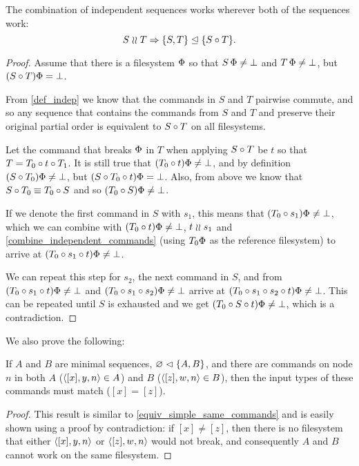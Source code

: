 \begin{mylem}\label{combine_independent_sequences}
The combination of independent sequences works wherever both of the sequences work:
\[ S\mathrel{\wr\wr} T \Rightarrow {\{S,T\}}\trianglelefteq{\{S\circ T\}}. \]
\end{mylem}
\begin{proof}
Assume that there is a filesystem $\Phi$ so that
$S\,\Phi\neq\bot$ and $T\,\Phi\neq\bot$, but
$(S\circ T)\Phi=\bot$.

From \cref{def_indep} we know that
the commands in $S$ and $T$ pairwise commute, and so any sequence
that contains the commands from $S$ and $T$ and preserve their original partial order
is equivalent to $S\circ T$ on all filesystems.

Let the command that breaks $\Phi$ in $T$ when applying $S\circ T$ be $t$
so that $T=T_0\circ t\circ T_1$.
It is still true that $(T_0 \circ t)\Phi\neq\bot$,
and by definition $(S\circ T_0)\Phi\neq\bot$,
but $(S\circ T_0\circ t)\Phi=\bot$.
Also, from above we know that $S\circ T_0\equiv T_0\circ S$
and so $(T_0 \circ S)\Phi\neq\bot$.

If we denote the first command in $S$ with $s_1$,
this means that $(T_0 \circ s_1)\Phi\neq\bot$,
which we can combine with $(T_0 \circ t)\Phi\neq\bot$, $t\mathrel{\wr\wr} s_1$ and
\cref{combine_independent_commands}
(using $T_0\Phi$ as the reference filesystem)
to arrive at $(T_0 \circ s_1\circ t)\Phi\neq\bot$.

We can repeat this step for $s_2$, the next command in $S$,
and from 
$(T_0 \circ s_1\circ t)\Phi\neq\bot$
and
$(T_0 \circ s_1\circ s_2)\Phi\neq\bot$
arrive at
$(T_0 \circ s_1\circ s_2\circ t)\Phi\neq\bot$.
This can be repeated until $S$ is exhausted and we get
$(T_0 \circ S\circ t)\Phi\neq\bot$, which is a contradiction.
\end{proof}

We also prove the following:

\begin{mylem}\label{worksinputmatch}
If $A$ and $B$ are minimal sequences, ${\varnothing}\vartriangleleft{\{A,B\}}$,
and there are commands on node $n$ in both $A$ ($\langle{[x],y,n}\rangle\in A$) and $B$ ($\langle{[z],w,n}\rangle\in B$),
then the input types of these commands must match ($[x]=[z]$).
\end{mylem}
\begin{proof}
This result is similar to \cref{equiv_simple_same_commands} and
is easily shown using a proof by contradiction: if $[x]\neq [z]$, then there is no filesystem that
either $\langle{[x],y,n}\rangle$ or $\langle{[z],w,n}\rangle$ would not break, 
and consequently $A$ and $B$ cannot work on the same filesystem.
\end{proof}


